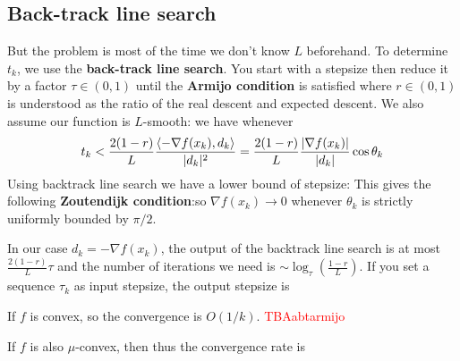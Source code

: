 \documentclass[a4paper]{mynotes}
\def\redd#1{\textcolor{red}{#1}}
\begin{document}
\subsection{Back-track line search}

But the problem is most of the time we don't know $L$ beforehand.
To determine $t_k$, we use the\textbf{ back-track line search}. You start with a stepsize then reduce it by a factor $\tau\in(0,1)$ until the \textbf{Armijo condition} is satisfied  where $r\in (0,1)$ is understood as the ratio of the real descent and expected descent.
We also assume our function is $L$-smooth:
we have
whenever 
 $$t_k< \frac{2(1-r)}{L}\frac{\braket{-\nabla f(x_k),d_k}}{|d_k|^2}=\frac{2(1-r)}{L}\frac{|\nabla f(x_k)|}{|d_k|}\cos \theta_k $$
 Using backtrack line search we have a lower bound of stepsize:
 This gives the following \textbf{Zoutendijk condition}:so $\nabla f(x_k)\to 0$ whenever $\theta_k$ is strictly uniformly bounded by $\pi/2$.


 In our case $d_k=-\nabla f(x_k)$, the output of the backtrack line search is at most ${\frac{2(1-r)}{L}}\tau$ and the number of iterations we need is $\sim\log_\tau \left(\frac{1-r}{L}\right)$. If you set a sequence $\tau_k$ as input stepsize, the output stepsize is 

If $f$ is convex, so the convergence is $O(1/k)$. \redd{TBAabtarmijo}

 If $f$ is also $\mu$-convex, then
 thus the convergence rate is 

\end{document}
